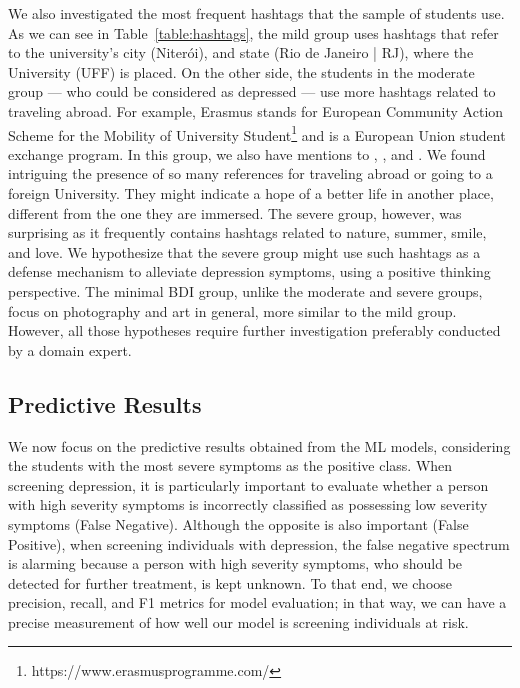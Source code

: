 \documentclass[letterpaper]{article} \usepackage{aaai20}  \usepackage{times}  \usepackage{helvet} \usepackage{courier}  \usepackage[hyphens]{url}  \usepackage{graphicx} \urlstyle{rm} \def\UrlFont{\rm}  \usepackage{graphicx}  \frenchspacing  \setlength{\pdfpagewidth}{8.5in}  \setlength{\pdfpageheight}{11in}  \usepackage[final]{changes}
\begin{document}
We also investigated the most frequent hashtags that the sample of students use. As we can see in Table~\ref{table:hashtags}, the mild group uses hashtags that refer to the university's city (Niterói), and state (Rio de Janeiro | RJ), where the University (UFF) is placed. On the other side, the students in the moderate group --- who could be considered as depressed --- use more hashtags related to traveling abroad. For example, Erasmus stands for European Community Action Scheme for the Mobility of University Student{\footnote{https://www.erasmusprogramme.com/}} and is a European Union student exchange program. In this group, we also have mentions to , , and . We found intriguing the presence of so many references for traveling abroad or going to a foreign University. They might indicate a hope of a better life in another place, different from the one they are immersed. The severe group, however, was surprising as it frequently contains hashtags related to nature, summer, smile, and love. We hypothesize that the severe group might use such hashtags as a defense mechanism to alleviate depression symptoms, using a positive thinking perspective. The minimal BDI group, unlike the moderate and severe groups, focus on photography and art in general, more similar to the mild group. However, all those hypotheses require further investigation preferably conducted by a domain expert.

\subsection{Predictive Results}

We now focus on the predictive results obtained from the ML models, considering the students with the most severe symptoms as the positive class. When screening depression, it is particularly important to evaluate whether a person with high severity symptoms is incorrectly classified as possessing low severity symptoms (False Negative). Although the opposite is also important (False Positive), when screening individuals with depression, the false negative spectrum is alarming because a person with high severity symptoms, who should be detected for further treatment, is kept unknown. To that end, we choose precision, recall, and F1 metrics for model evaluation; in that way, we can have a precise measurement of how well our model is screening individuals at risk.
\end{document}

